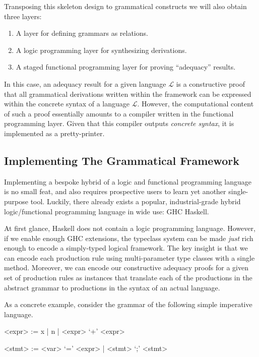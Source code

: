 \documentclass[a4paper,UKenglish,cleveref, autoref, thm-restate,anonymous]{lipics-v2021}
\begin{document}
Transposing this skeleton design to grammatical constructs
we will also obtain three layers:

\begin{enumerate}
\item A layer for defining grammars as relations.
\item A logic programming layer for synthesizing derivations.
\item A staged functional programming layer for proving ``adequacy'' results.
\end{enumerate}

In this case, an adequacy result for a given language \(\mathcal{L}\) is a constructive proof that
all grammatical derivations written within the framework can be expressed within the
concrete syntax of a language \(\mathcal{L}\). However, the computational content of such a proof
essentially amounts to a compiler written in the functional programming layer. Given that this
compiler outputs \emph{concrete syntax}, it is implemented as a pretty-printer.

\subsection{Implementing The Grammatical Framework}
\label{sec:framework-implementation}

Implementing a bespoke hybrid of a logic and functional programming language is
no small feat, and also requires prospective users to learn yet another single-purpose
tool. Luckily, there already exists a popular, industrial-grade hybrid logic/functional
programming language in wide use: GHC Haskell.

At first glance, Haskell does not contain a logic programming language. However,
if we enable enough GHC extensions, the typeclass system can be made \emph{just}
rich enough to encode a simply-typed logical framework. The key insight is that
we can encode each production rule using multi-parameter type classes with
a single method. Moreover, we can encode our constructive adequacy proofs for a
given set of production rules as instances that translate each of the productions
in the abstract grammar to productions in the syntax of an actual language.

As a concrete example, consider the grammar of the following simple imperative language.
\begin{grammar}
  <expr> := x | n | <expr> `+' <expr>
  
  <stmt> := <var> `=' <expr> | <stmt> `;' <stmt>
\end{grammar}
\end{document}
